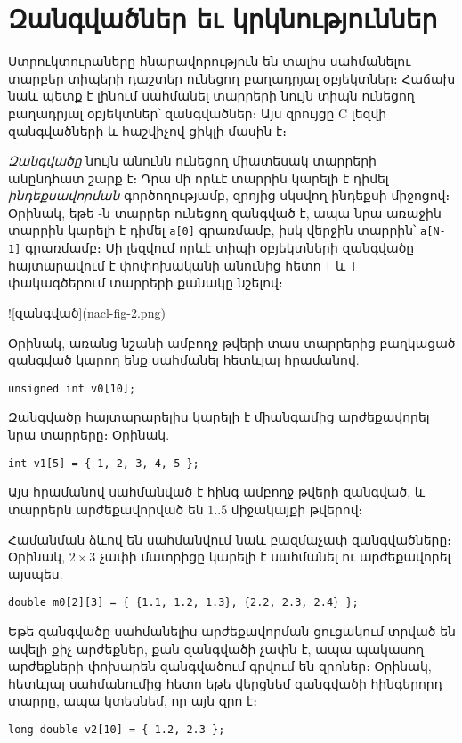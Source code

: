 \chapter{Զանգվածներ եւ կրկնություններ}

Ստրուկտուրաները հնարավորություն են տալիս սահմանելու տարբեր տիպերի դաշտեր
ունեցող բաղադրյալ օբյեկտներ։ Հաճախ նաև պետք է լինում սահմանել տարրերի նույն
տիպն ունեցող բաղադրյալ օբյեկտներ՝ զանգվածներ։ Այս զրույցը C լեզվի զանգվածների
և հաշվիչով ցիկլի մասին է։

\emph{Զանգվածը} նույն անունն ունեցող միատեսակ տարրերի անընդհատ շարք է։
Դրա մի որևէ տարրին կարելի է դիմել \emph{ինդեքսավորման} գործողությամբ,
զրոյից սկսվող ինդեքսի միջոցով։ Օրինակ, եթե -ն  տարրեր
ունեցող զանգված է, ապա նրա առաջին տարրին կարելի է դիմել \Verb|a[0]|
գրառմամբ, իսկ վերջին տարրին՝ \Verb|a[N-1]| գրառմամբ։ Սի լեզվում որևէ տիպի
օբյեկտների զանգվածը հայտարավում է փոփոխականի անունից հետո \Verb|[| և
\Verb|]| փակագծերում տարրերի քանակը նշելով։

![զանգված](nacl-fig-2.png)

Օրինակ, առանց նշանի ամբողջ թվերի տաս տարրերից բաղկացած զանգված կարող ենք
սահմանել հետևյալ հրամանով.

\begin{Verbatim}
unsigned int v0[10];
\end{Verbatim}

Զանգվածը հայտարարելիս կարելի է միանգամից արժեքավորել նրա տարրերը։ Օրինակ.

\begin{Verbatim}
int v1[5] = { 1, 2, 3, 4, 5 };
\end{Verbatim}

Այս հրամանով սահմանված է հինգ ամբողջ թվերի զանգված, և տարրերն արժեքավորված
են \(1..5\) միջակայքի թվերով։

Համանման ձևով են սահմանվում նաև բազմաչափ զանգվածները։ Օրինակ, \(2\times 3\)
չափի մատրիցը կարելի է սահմանել ու արժեքավորել այսպես.

\begin{Verbatim}
double m0[2][3] = { {1.1, 1.2, 1.3}, {2.2, 2.3, 2.4} };
\end{Verbatim}

Եթե զանգվածը սահմանելիս արժեքավորման ցուցակում տրված են ավելի քիչ արժեքներ,
քան զանգվածի չափն է, ապա պակասող արժեքների փոխարեն զանգվածում գրվում են
զրոներ։ Օրինակ, հետևյալ սահմանումից հետո եթե վերցնեմ  զանգվածի
հինգերորդ տարրը, ապա կտեսնեմ, որ այն զրո է։

\begin{Verbatim}
long double v2[10] = { 1.2, 2.3 };
\end{Verbatim}

